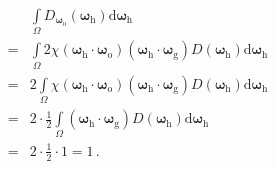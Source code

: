 \begin{align}
      & \int\limits_{\varOmega}D_{{\bm\omega}_{\mathrm{o}}}({\bm\omega}_{\mathrm{h}})
    \mathrm{d}{\bm\omega}_{\mathrm{h}}\nonumber                                                         \\
    = & \int\limits_{\varOmega}2\chi({\bm\omega}_{\mathrm{h}}\cdot{\bm\omega}_{\mathrm{o}})
    ({\bm\omega}_{\mathrm{h}}\cdot{\bm\omega}_{\mathrm{g}})
    D({\bm\omega}_{\mathrm{h}})\mathrm{d}{\bm\omega}_{\mathrm{h}}\nonumber                              \\
    = & 2\int\limits_{\varOmega}\chi({\bm\omega}_{\mathrm{h}}\cdot{\bm\omega}_{\mathrm{o}})
    ({\bm\omega}_{\mathrm{h}}\cdot{\bm\omega}_{\mathrm{g}})
    D({\bm\omega}_{\mathrm{h}})\mathrm{d}{\bm\omega}_{\mathrm{h}}\nonumber                              \\
    = & 2\cdot\frac{1}{2}\int\limits_{\varOmega}({\bm\omega}_{\mathrm{h}}\cdot{\bm\omega}_{\mathrm{g}})
    D({\bm\omega}_{\mathrm{h}})\mathrm{d}{\bm\omega}_{\mathrm{h}}\nonumber                              \\
    = & 2\cdot\frac{1}{2}\cdot1=1\, .
\end{align}

